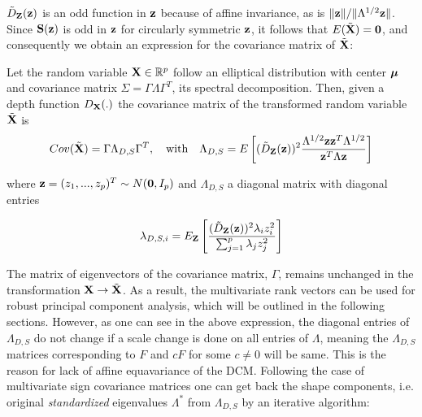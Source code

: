\documentclass[fleqn,12pt]{article}
\begin{document}

$\tilde D_{\mathbf{Z}}({\bf{z}})$ is an odd function in ${\bf{z}}$ because of affine invariance, as is $\| {\bf{z}} \| / \|\Lambda^{1/2} {\bf{z}} \|$. Since ${\mathbf{S}}({\bf{z}})$ is odd in ${\bf{z}}$ for circularly symmetric ${\bf{z}}$, it follows that $E(\tilde {{\mathbf{X}}}) = \bf0$, and consequently we obtain an expression for the covariance matrix of $\tilde {{\mathbf{X}}}$:

\begin{Theorem} \label{Theorem:covform}
Let the random variable ${\mathbf{X}} \in \mathbb{R}^p$ follow an elliptical distribution with center ${\boldsymbol{\mu}}$ and covariance matrix $\Sigma = \Gamma\Lambda\Gamma^T$, its spectral decomposition. Then, given a depth function $D_{\mathbf{X}}(.)$ the covariance matrix of the transformed random variable $\tilde{{\mathbf{X}}}$ is
\begin{equation} \label{equation:covformEq1}
Cov(\tilde {{\mathbf{X}}}) = \Gamma \Lambda_{D,S} \Gamma^T,\quad\mbox{with}\quad \Lambda_{D,S} = E \left[ (\tilde D_{\mathbf{Z}}({\bf{z}}))^2 \frac{\Lambda^{1/2} {\bf{z}} {\bf{z}}^T \Lambda^{1/2}}{{\bf{z}}^T \Lambda {\bf{z}}} \right]
\end{equation}

where ${\bf{z}} = (z_1,...,z_p)^T \sim N({\bf 0}, I_p)$ and $\Lambda_{D,S}$ a diagonal matrix with diagonal entries

$$ \lambda_{D,S,i} = E_{\mathbf{Z}} \left[ \frac{(\tilde D_{\mathbf{Z}}({\bf{z}}))^2 \lambda_i z_i^2}{\sum_{j=1}^p \lambda_j z_j^2} \right] $$
\end{Theorem}

The matrix of eigenvectors of the covariance matrix, $\Gamma$, remains unchanged in the transformation ${\mathbf{X}} \rightarrow \tilde {{\mathbf{X}}}$. As a result, the multivariate rank vectors can be used for robust principal component analysis, which will be outlined in the following sections. However, as one can see in the above expression, the diagonal entries of $\Lambda_{D,S}$ do not change if a scale change is done on all entries of $\Lambda$, meaning the $\Lambda_{D,S}$ matrices corresponding to $F$ and $cF$ for some $c \neq 0$ will be same. This is the reason for lack of affine equavariance of the DCM. Following the case of multivariate sign covariance matrices \citep{taskinen12} one can get back the shape components, i.e. original \textit{standardized} eigenvalues $\Lambda^*$ from $\Lambda_{D,S}$ by an iterative algorithm:
\end{document}
